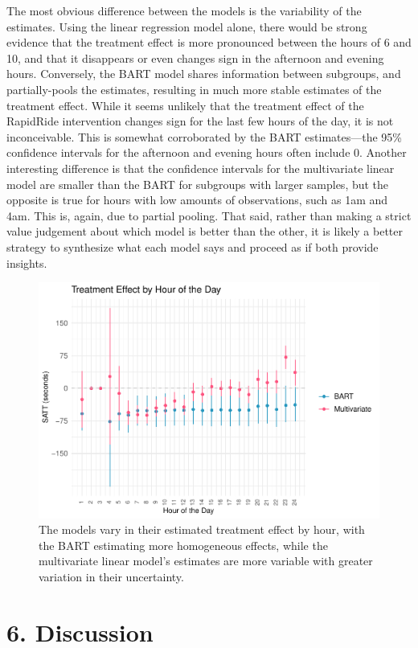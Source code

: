 \documentclass[
  12pt,
]{article}
\begin{document}
The most obvious difference between the models is the variability of the
estimates. Using the linear regression model alone, there would be
strong evidence that the treatment effect is more pronounced between the
hours of 6 and 10, and that it disappears or even changes sign in the
afternoon and evening hours. Conversely, the BART model shares
information between subgroups, and partially-pools the estimates,
resulting in much more stable estimates of the treatment effect. While
it seems unlikely that the treatment effect of the RapidRide
intervention changes sign for the last few hours of the day, it is not
inconceivable. This is somewhat corroborated by the BART estimates---the
95\% confidence intervals for the afternoon and evening hours often
include 0. Another interesting difference is that the confidence
intervals for the multivariate linear model are smaller than the BART
for subgroups with larger samples, but the opposite is true for hours
with low amounts of observations, such as 1am and 4am. This is, again,
due to partial pooling. That said, rather than making a strict value
judgement about which model is better than the other, it is likely a
better strategy to synthesize what each model says and proceed as if
both provide insights.

\begin{figure}

{\centering \includegraphics[width=0.7\linewidth]{figures/unnamed-chunk-15-1} 

}

\caption{The models vary in their estimated treatment effect by hour, with the BART estimating more homogeneous effects, while the multivariate linear model's estimates are more variable with greater variation in their uncertainty.}\label{fig:unnamed-chunk-15}
\end{figure}

\section{6. Discussion}\label{discussion}
\end{document}
